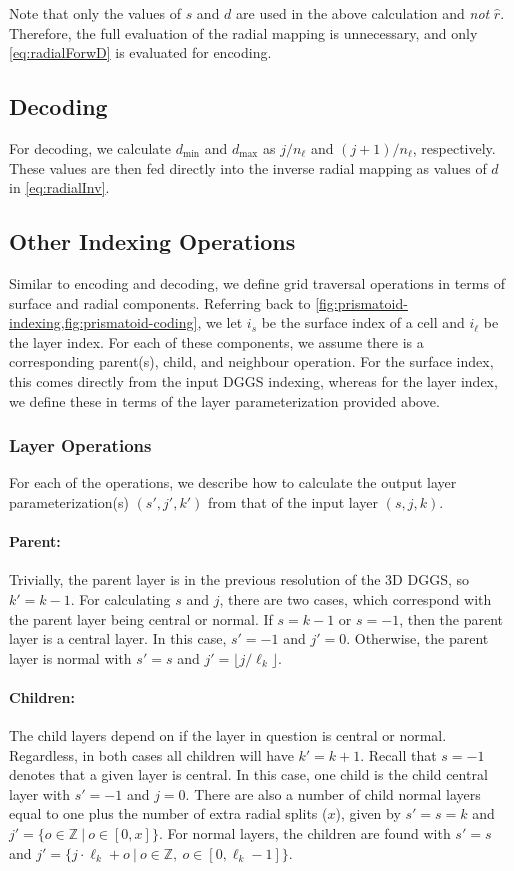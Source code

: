 Note that only the values of $s$ and $d$ are used in the above calculation and \textit{not} $\hat{r}$.
Therefore, the full evaluation of the radial mapping is unnecessary, and only \cref{eq:radialForwD} is evaluated for encoding.


\subsection{Decoding}
For decoding, we calculate $d_\mathrm{min}$ and $d_\mathrm{max}$ as $j/n_\ell$ and $(j+1)/n_\ell$, respectively.
These values are then fed directly into the inverse radial mapping as values of $d$ in \cref{eq:radialInv}.


\subsection{Other Indexing Operations}
Similar to encoding and decoding, we define grid traversal operations in terms of surface and radial components.
Referring back to \cref{fig:prismatoid-indexing,fig:prismatoid-coding}, we let $i_s$ be the surface index of a cell and $i_\ell$ be the layer index.
For each of these components, we assume there is a corresponding parent(s), child, and neighbour operation.
For the surface index, this comes directly from the input DGGS indexing, whereas for the layer index, we define these in terms of the layer parameterization provided above.


\subsubsection{Layer Operations}
For each of the operations, we describe how to calculate the output layer parameterization(s) $(s',j',k')$ from that of the input layer $(s,j,k)$.


\paragraph{Parent:}
Trivially, the parent layer is in the previous resolution of the 3D DGGS, so $k' = k - 1$.
For calculating $s$ and $j$, there are two cases, which correspond with the parent layer being central or normal.
If $s = k-1$ or $s = -1$, then the parent layer is a central layer. In this case, $s' = -1$ and $j' = 0$.
Otherwise, the parent layer is normal with $s' = s$ and $j' = \lfloor j / \ell_k \rfloor$.


\paragraph{Children:}
The child layers depend on if the layer in question is central or normal.
Regardless, in both cases all children will have $k' = k + 1$.
Recall that $s = -1$ denotes that a given layer is central.
In this case, one child is the child central layer with $s' = -1$ and $j = 0$.
There are also a number of child normal layers equal to one plus the number of extra radial splits ($x$), given by $s' = s = k$ and $j' = \{ o \in \mathbb{Z} \ | \ o \in [0, x] \}$.
For normal layers, the children are found with $s' = s$ and $j' = \{ j \cdot \ell_k + o \ | \  o \in \mathbb{Z}, \ o \in [0, \ell_k - 1] \}$.


